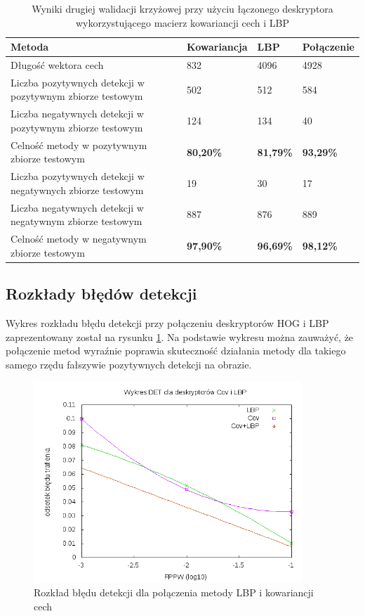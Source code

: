 \begin{center}
    \begin{longtable}{ | p{5cm} | p{3cm} | p{3cm} | p{3cm} |}
    \caption{Wyniki drugiej walidacji krzyżowej przy użyciu łączonego deskryptora wykorzystującego macierz kowariancji cech i LBP}
    \label{tab:covlbp_second}\\
    \hline
	Metoda & Kowariancja & LBP & Połączenie \\ \hline
    Długość wektora cech & 832 & 4096 & 4928 \\ \hline
    Liczba pozytywnych detekcji w pozytywnym zbiorze testowym & 502 & 512 & 584 \\ \hline
    Liczba negatywnych detekcji w pozytywnym zbiorze testowym & 124 & 134 & 40 \\ \hline
    Celność metody w pozytywnym zbiorze testowym & \textbf{80,20\%} & \textbf{81,79\%} & \textbf{93,29\%} \\ \hline
    Liczba pozytywnych detekcji w negatywnych zbiorze testowym & 19 & 30 & 17 \\ \hline
    Liczba negatywnych detekcji w negatywnym zbiorze testowym & 887 & 876 & 889 \\ \hline
    Celność metody w negatywnym zbiorze testowym & \textbf{97,90\%} & \textbf{96,69\%} & \textbf{98,12\%} \\ \hline
    \end{longtable}
\end{center}


\subsection{Rozkłady błędów detekcji}

Wykres rozkładu błędu detekcji przy połączeniu deskryptorów HOG i LBP zaprezentowany został na rysunku \ref{fig:covlbp_det}. Na podstawie wykresu można zauważyć, że połączenie metod wyraźnie poprawia skuteczność działania metody dla takiego samego rzędu fałszywie pozytywnych detekcji na obrazie. 

\begin{figure}[htb]
\centering
\includegraphics[width=0.9\textwidth]{covlbp_det.png}
\caption{Rozkład błędu detekcji dla połączenia metody LBP i kowariancji cech}
\label{fig:covlbp_det}
\end{figure}

